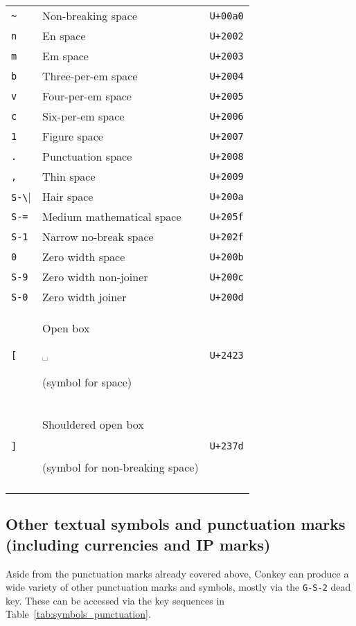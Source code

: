 \documentclass[oneside]{memoir}
\newcommand{\key}{\verb}
\newcommand{\out}[1]{\colorbox{gray!20}{\strut{}#1}}
\newcommand{\uni}[1]{\texttt{#1}}
\begin{document}
\begin{table}
\begin{minipage}{0.5\paperwidth}
\begin{tabular}{lll}
\key|~|   & Non-breaking space                  & \uni{U+00a0} \\
\key|n|   & En space                            & \uni{U+2002} \\
\key|m|   & Em space                            & \uni{U+2003} \\
\key|b|   & Three-per-em space                  & \uni{U+2004} \\
\key|v|   & Four-per-em space                   & \uni{U+2005} \\
\key|c|   & Six-per-em space                    & \uni{U+2006} \\
\key|1|   & Figure space                        & \uni{U+2007} \\
\key|.|   & Punctuation space                   & \uni{U+2008} \\
\key|,|   & Thin space                          & \uni{U+2009} \\
\key|S-\| & Hair space                          & \uni{U+200a} \\
\key|S-=| & Medium mathematical space           & \uni{U+205f} \\
\key|S-1| & Narrow no-break space               & \uni{U+202f} \\
\key|0|   & Zero width space                    & \uni{U+200b} \\
\key|S-9| & Zero width non-joiner               & \uni{U+200c} \\
\key|S-0| & Zero width joiner                   & \uni{U+200d} \\
\key|[|   & Open box \out{␣} (symbol for space) & \uni{U+2423} \\
\key|]|
  & \makecell{Shouldered open box \out{\tfbs{⍽}}\\\quad(symbol for non-breaking space)}
  & \uni{U+237d} \\
\bottomrule&&
\end{tabular}
\end{minipage}
\end{table}

\subsection{Other textual symbols and punctuation marks (including currencies and IP marks)}
\label{sec:symbols_punctuation}

Aside from the punctuation marks already covered above,
  Conkey can produce a wide variety of other punctuation marks and symbols,
  mostly via the \key|G-S-2| dead key.
These can be accessed via the key sequences in Table~\ref{tab:symbols_punctuation}.
\end{document}
